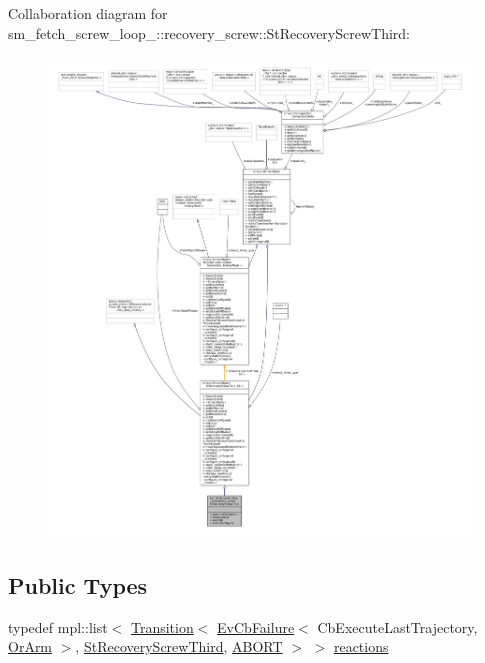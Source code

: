 Collaboration diagram for sm\+\_\+fetch\+\_\+screw\+\_\+loop\+\_\+:\+:recovery\+\_\+screw\+:\+:St\+Recovery\+Screw\+Third\+:
\nopagebreak
\begin{figure}[H]
\begin{center}
\leavevmode
\includegraphics[width=350pt]{structsm__fetch__screw__loop__1_1_1recovery__screw_1_1StRecoveryScrewThird__coll__graph}
\end{center}
\end{figure}
\subsection*{Public Types}
\begin{DoxyCompactItemize}
\item 
typedef mpl\+::list$<$ \hyperlink{classsmacc_1_1Transition}{Transition}$<$ \hyperlink{structsmacc_1_1EvCbFailure}{Ev\+Cb\+Failure}$<$ Cb\+Execute\+Last\+Trajectory, \hyperlink{classsm__fetch__screw__loop__1_1_1OrArm}{Or\+Arm} $>$, \hyperlink{structsm__fetch__screw__loop__1_1_1recovery__screw_1_1StRecoveryScrewThird}{St\+Recovery\+Screw\+Third}, \hyperlink{structsmacc_1_1default__transition__tags_1_1ABORT}{A\+B\+O\+RT} $>$ $>$ \hyperlink{structsm__fetch__screw__loop__1_1_1recovery__screw_1_1StRecoveryScrewThird_aa6944457713639a137fe0ec81fd3b35e}{reactions}
\end{DoxyCompactItemize}

